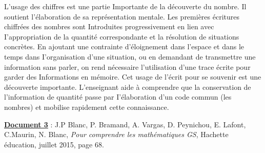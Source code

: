\begin{center}
   \begin{minipage}{15cm}
      \begin{flushleft}
         \textsf{L'usage des chiffres est une partie Importante de la découverte du nombre. Il soutient l'élaboration de sa représentation mentale. Les premières écritures chiffrées des nombres sont Introduites progressivement en lien avec I'appropriation de la quantité correspondante et la résolution de situations concrètes. En ajoutant une contrainte d'éloignement dans l'espace et dans le temps dans I'organisation d'une situation, ou en demandant de transmettre une information sans parler, on rend nécessaire l'utilisation d'une trace écrite pour garder des Informations en mémoire. Cet usage de l'écrit pour se souvenir est une découverte importante. L'enseignant aide à comprendre que la conservation de l'information de quantité passe par I'élaboration d'un code commun (les nombres) et mobilise rapidement cette connaissance.}
      \end{flushleft}
   \end{minipage}
\end{center}
  
\bigskip

{\bf\uline{Document 3}} : J.P Blanc, P. Bramand, A. Vargas, D. Peynichou, E. Lafont, C.Maurin, N. Blanc, {\it Pour comprendre les mathématiques GS}, Hachette éducation, juillet 2015, page 68.

\begin{center}
\end{center}


